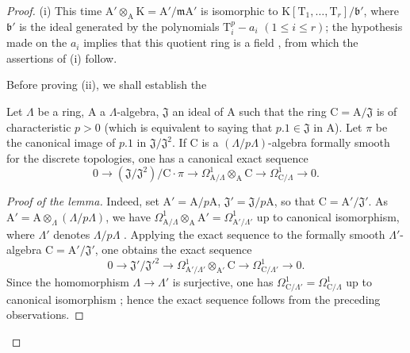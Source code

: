 \begin{proof}
(i) This time $\mathrm{A}'\otimes_\mathrm{A}\mathrm{K}=\mathrm{A}'/\mathfrak{m}\mathrm{A}'$ is isomorphic to $\mathrm{K}[\mathrm{T}_1,\ldots,\mathrm{T}_r]/\mathfrak{b}'$, where $\mathfrak{b}'$ is the ideal generated by the polynomials $\mathrm{T}_i^p-a_i$ $(1\leq i\leq r)$; the hypothesis made on the $a_i$ implies that this quotient ring is a field , from which the assertions of (i) follow.

Before proving (ii), we shall establish the

\begin{lemma}[22.4.4.2]
\label{0.22.4.4.2}
Let $\Lambda$ be a ring, $\mathrm{A}$ a $\Lambda$-algebra, $\mathfrak{J}$ an ideal of $\mathrm{A}$ such that the ring $\mathrm{C}=\mathrm{A}/\mathfrak{J}$ is of characteristic $p>0$ (which is equivalent to saying that $p.1\in\mathfrak{J}$ in $\mathrm{A}$).
Let $\pi$ be the canonical image of $p.1$ in $\mathfrak{J}/\mathfrak{J}^2$.
If $\mathrm{C}$ is a $(\Lambda/p\Lambda)$-algebra formally smooth for the discrete topologies, one has a canonical exact sequence
\begin{equation}
\label{0.22.4.4.3}
  0\longrightarrow(\mathfrak{J}/\mathfrak{J}^2)/\mathrm{C}\cdot\pi
  \longrightarrow\Omega^1_{\mathrm{A}/\Lambda}\otimes_\mathrm{A}\mathrm{C}
  \longrightarrow\Omega^1_{\mathrm{C}/\Lambda}\longrightarrow0.
  \tag{22.4.4.3}
\end{equation}
\end{lemma}

\begin{proof}[Proof of the lemma]
Indeed, set $\mathrm{A}'=\mathrm{A}/p\mathrm{A}$, $\mathfrak{J}'=\mathfrak{J}/p\mathrm{A}$, so that $\mathrm{C}=\mathrm{A}'/\mathfrak{J}'$.
As $\mathrm{A}'=\mathrm{A}\otimes_\Lambda(\Lambda/p\Lambda)$, we have $\Omega^1_{\mathrm{A}/\Lambda}\otimes_\mathrm{A}\mathrm{A}'=\Omega^1_{\mathrm{A}'/\Lambda'}$ up to canonical isomorphism, where $\Lambda'$ denotes $\Lambda/p\Lambda$ .
Applying the exact sequence  to the formally smooth $\Lambda'$-algebra $\mathrm{C}=\mathrm{A}'/\mathfrak{J}'$, one obtains the exact sequence
\[
  0\longrightarrow\mathfrak{J}'/\mathfrak{J}'^2
  \longrightarrow\Omega^1_{\mathrm{A}'/\Lambda'}\otimes_{\mathrm{A}'}\mathrm{C}
  \longrightarrow\Omega^1_{\mathrm{C}/\Lambda'}\longrightarrow0.
\]
Since the homomorphism $\Lambda\to\Lambda'$ is surjective, one has $\Omega^1_{\mathrm{C}/\Lambda'}=\Omega^1_{\mathrm{C}/\Lambda}$ up to canonical isomorphism ; hence the exact sequence  follows from the preceding observations.
\end{proof}


\end{proof}
